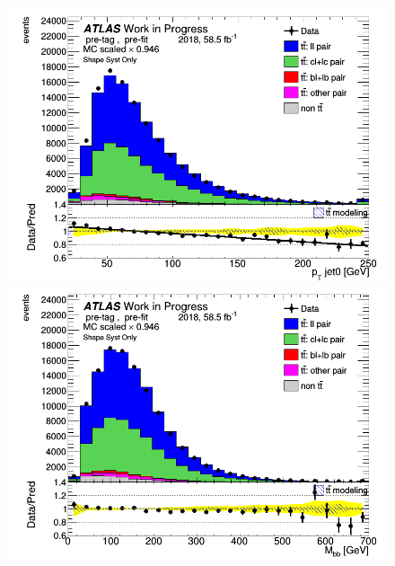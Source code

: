 \documentclass[letterpaper,12pt]{article}
\begin{document}
\begin{figure}[h]
\begin{minipage}[b]{.45\textwidth}
\end{minipage}\hfill
\begin{minipage}[b]{.45\textwidth}
\centering
\includegraphics[width=1\textwidth]{Distribution_March/DataMC_J0_pt.png}
\end{minipage}\hfill
\begin{minipage}[b]{.45\textwidth}
\centering
\includegraphics[width=1\textwidth]{Distribution_March/DataMC_Mbb.png}
\end{minipage}\hfill

\end{figure}
\end{document}

